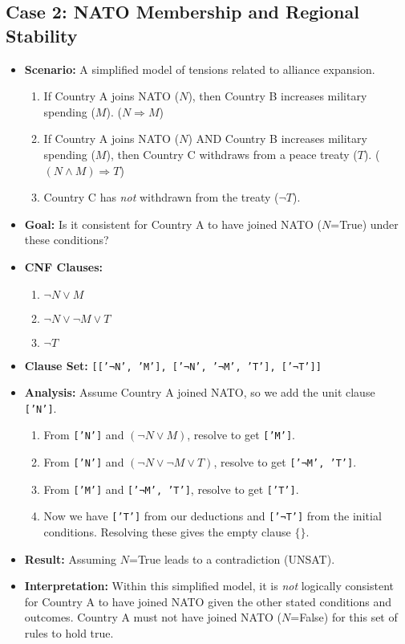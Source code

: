 \documentclass[11pt, a4paper]{article}
\begin{document}
\subsection*{Case 2: NATO Membership and Regional Stability}
\begin{itemize}
    \item \textbf{Scenario:} A simplified model of tensions related to alliance expansion.
    \begin{enumerate}
        \item If Country A joins NATO ($N$), then Country B increases military spending ($M$). ($N \Rightarrow M$)
        \item If Country A joins NATO ($N$) AND Country B increases military spending ($M$), then Country C withdraws from a peace treaty ($T$). ($(N \wedge M) \Rightarrow T$)
        \item Country C has \textit{not} withdrawn from the treaty ($\neg T$).
    \end{enumerate}
    \item \textbf{Goal:} Is it consistent for Country A to have joined NATO ($N$=True) under these conditions?
    \item \textbf{CNF Clauses:}
    \begin{enumerate}
        \item $\neg N \vee M$
        \item $\neg N \vee \neg M \vee T$
        \item $\neg T$
    \end{enumerate}
    \item \textbf{Clause Set:} \texttt{[['¬N', 'M'], ['¬N', '¬M', 'T'], ['¬T']]}
    \item \textbf{Analysis:} Assume Country A joined NATO, so we add the unit clause \texttt{['N']}.
    \begin{enumerate}
        \item From \texttt{['N']} and $(\neg N \vee M)$, resolve to get \texttt{['M']}.
        \item From \texttt{['N']} and $(\neg N \vee \neg M \vee T)$, resolve to get \texttt{['¬M', 'T']}.
        \item From \texttt{['M']} and \texttt{['¬M', 'T']}, resolve to get \texttt{['T']}.
        \item Now we have \texttt{['T']} from our deductions and \texttt{['¬T']} from the initial conditions. Resolving these gives the empty clause $\{\}$.
    \end{enumerate}
    \item \textbf{Result:} Assuming $N$=True leads to a contradiction (UNSAT).
    \item \textbf{Interpretation:} Within this simplified model, it is \textit{not} logically consistent for Country A to have joined NATO given the other stated conditions and outcomes. Country A must not have joined NATO ($N$=False) for this set of rules to hold true.
\end{itemize}
\end{document}
